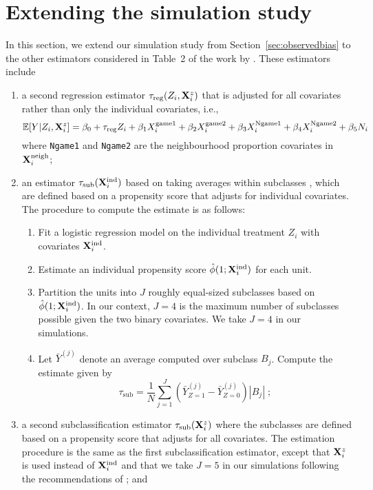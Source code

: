 \documentclass[10pt]{article}
\begin{document}
\section{Extending the simulation study}

In this section, we extend our simulation study from Section~\ref{sec:observedbias} to the other estimators considered in Table~2 of the work by \textcite{Forastiere:2021}. These estimators include
\begin{enumerate}

\item
a second regression estimator $\tau_\text{reg}(Z_i,\mathbf{X}_i^z)$ that is adjusted for all covariates rather than only the individual covariates, i.e.,
\[
\mathbb{E}[Y|Z_i,\mathbf{X}_i^z] = \beta_0 + \tau_\text{reg}Z_i + \beta_1X_i^\text{game1} + \beta_2X_i^\text{game2} + \beta_3X_i^\text{Ngame1} + \beta_4X_i^\text{Ngame2} + \beta_5N_i
\]
where \verb|Ngame1| and \verb|Ngame2| are the neighbourhood proportion covariates in $\mathbf{X}^{\text{neigh}}_i$;

\item
an estimator $\tau_\text{sub}(\mathbf{X}^{\text{ind}}_i)$ based on taking averages within subclasses \parencite{Imbens:2015}, which are defined based on a propensity score that adjusts for individual covariates. The procedure to compute the estimate is as follows:
\begin{enumerate}
\item
Fit a logistic regression model on the individual treatment $Z_i$ with covariates $\mathbf{X}^{\text{ind}}_i$.
\item
Estimate an individual propensity score $\hat{\phi}(1;\mathbf{X}^{\text{ind}}_i)$ for each unit.
\item
Partition the units into $J$ roughly equal-sized subclasses based on $\hat{\phi}(1;\mathbf{X}^{\text{ind}}_i)$. In our context, $J=4$ is the maximum number of subclasses possible given the two binary covariates. We take $J=4$ in our simulations.
\item
Let $\bar{Y}^{(j)}$ denote an average computed over subclass $B_j$. Compute the estimate given by
\[
\tau_\text{sub} = \frac{1}{N}\sum_{j=1}^J\left(\bar{Y}_{Z=1}^{(j)}-\bar{Y}_{Z=0}^{(j)}\right)|B_j| \;;
\]
\end{enumerate}

\item
a second subclassification estimator $\tau_\text{sub}(\mathbf{X}^z_i)$ where the subclasses are defined based on a propensity score that adjusts for all covariates. The estimation procedure is the same as the first subclassification estimator, except that $\mathbf{X}^z_i$ is used instead of $\mathbf{X}^{\text{ind}}_i$ and that we take $J=5$ in our simulations following the recommendations of \textcite{Rosenbaum:1984}; and


\end{enumerate}
\end{document}
